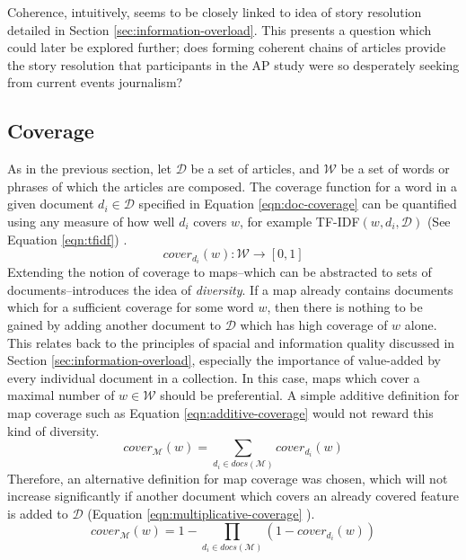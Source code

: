 Coherence, intuitively, seems to be closely linked to idea of story resolution detailed in Section \ref{sec:information-overload}. This presents a question which could later be explored further; does forming coherent chains of articles provide the story resolution that participants in the AP study \citep{anewmodelfornews} were so desperately seeking from current events journalism?
	
\subsection{Coverage}
As in the previous section, let $\mathcal{D}$ be a set of articles, and $\mathcal{W}$ be a set of words or phrases of which the articles are composed. The coverage function for a word in a given document $d_i \in \mathcal{D}$ specified in Equation \ref{eqn:doc-coverage} can be quantified using any measure of how well $d_i$ covers $w$, for example TF-IDF$(w, d_i, \mathcal{D})$ (See Equation \ref{eqn:tfidf}) \citep{GeneratingInformationMaps}.
\begin{equation}
	\label{eqn:doc-coverage}
	cover_{d_i}(w) : \mathcal{W} \rightarrow [0,1]
\end{equation}
Extending the notion of coverage to maps--which can be abstracted to sets of documents--introduces the idea of \textit{diversity}. If a map already contains documents which for a sufficient coverage for some word $w$, then there is nothing to be gained by adding another document to $\mathcal{D}$ which has high coverage of $w$ alone. This relates back to the principles of spacial and information quality discussed in Section \ref{sec:information-overload}, especially the importance of value-added by every individual document in a collection. In this case, maps which cover a maximal number of $w \in \mathcal{W}$ should be preferential. A simple additive definition for map coverage such as Equation \ref{eqn:additive-coverage} \citep{GeneratingInformationMaps} would not reward this kind of diversity.
\begin{equation}
	\label{eqn:additive-coverage}
	cover_\mathcal{M}(w) = \sum_{d_i\in docs(\mathcal{M})}cover_{d_i}(w)
\end{equation}
Therefore, an alternative definition for map coverage was chosen, which will not increase significantly if another document which covers an already covered feature is added to $\mathcal{D}$ (Equation \ref{eqn:multiplicative-coverage} \citep{GeneratingInformationMaps}).
\begin{equation}
	\label{eqn:multiplicative-coverage}
	cover_\mathcal{M}(w) = 1 - \prod_{d_i\in docs(\mathcal{M})}(1-cover_{d_i}(w))
\end{equation}
